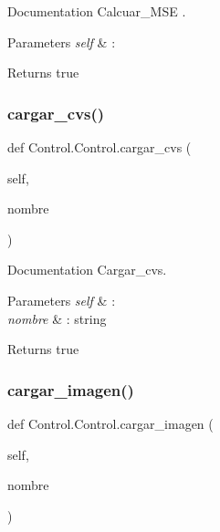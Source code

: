 Documentation Calcuar\+\_\+\+M\+SE . 


\begin{DoxyParams}{Parameters}
{\em self} & \+: \\
\hline
\end{DoxyParams}
\begin{DoxyReturn}{Returns}
true 
\end{DoxyReturn}
\mbox{\label{class_control_1_1_control_af797736917f8b84301deec8568ee1fa9}} 
\subsubsection{\texorpdfstring{cargar\+\_\+cvs()}{cargar\_cvs()}}
{\footnotesize\ttfamily def Control.\+Control.\+cargar\+\_\+cvs (\begin{DoxyParamCaption}\item[{}]{self,  }\item[{}]{nombre }\end{DoxyParamCaption})}



Documentation Cargar\+\_\+cvs. 


\begin{DoxyParams}{Parameters}
{\em self} & \+: \\
\hline
{\em nombre} & \+: string \\
\hline
\end{DoxyParams}
\begin{DoxyReturn}{Returns}
true 
\end{DoxyReturn}
\mbox{\label{class_control_1_1_control_aae955f5fe750e5f2d2764ff3893b75f5}} 
\subsubsection{\texorpdfstring{cargar\+\_\+imagen()}{cargar\_imagen()}}
{\footnotesize\ttfamily def Control.\+Control.\+cargar\+\_\+imagen (\begin{DoxyParamCaption}\item[{}]{self,  }\item[{}]{nombre }\end{DoxyParamCaption})}



